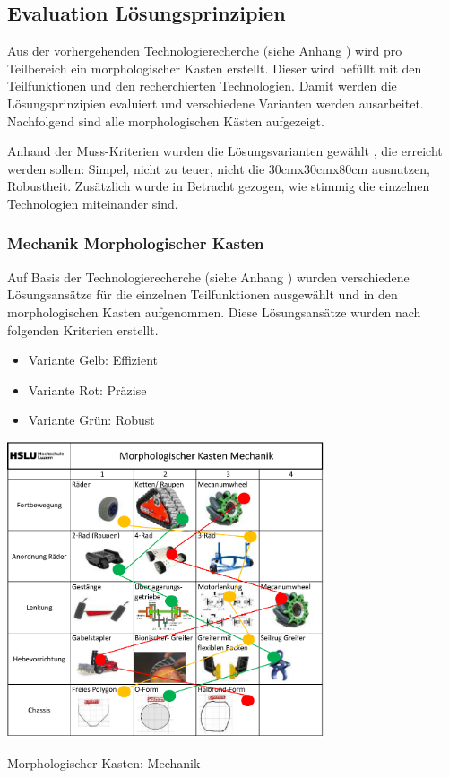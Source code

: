 \subsection*{Evaluation Lösungsprinzipien}\label{mk}


Aus der vorhergehenden Technologierecherche (siehe Anhang ) wird pro Teilbereich ein morphologischer Kasten erstellt. Dieser wird befüllt mit den Teilfunktionen und den recherchierten Technologien. Damit werden die Lösungsprinzipien evaluiert und verschiedene Varianten werden ausarbeitet. Nachfolgend sind alle morphologischen Kästen aufgezeigt.

Anhand der Muss-Kriterien wurden die Lösungsvarianten gewählt , die erreicht werden sollen: Simpel, nicht zu teuer, nicht die 30cmx30cmx80cm ausnutzen, Robustheit. Zusätzlich wurde in Betracht gezogen, wie stimmig die einzelnen Technologien miteinander sind.

\subsubsection*{Mechanik Morphologischer Kasten}


Auf Basis der Technologierecherche (siehe Anhang ) wurden verschiedene Lösungsansätze für die einzelnen Teilfunktionen ausgewählt und in den morphologischen Kasten aufgenommen.  Diese Lösungsansätze wurden nach folgenden Kriterien erstellt.

\begin{itemize}
    \item Variante Gelb: Effizient
    \item Variante Rot: Präzise
    \item Variante Grün: Robust
\end{itemize}

\begin{table}[H]
\centering
\includegraphics[width=0.7\textwidth]{assets/MK_Maschinentechnik.pdf}
\caption{Morphologischer Kasten: Mechanik}
\label{table:mk-mechanik}
\end{table}


